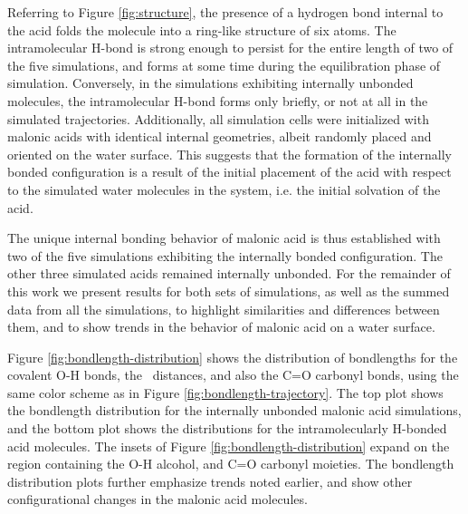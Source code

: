 Referring to Figure \ref{fig:structure}, the presence of a hydrogen bond internal to the acid folds the molecule into a ring-like structure of six atoms. The intramolecular H-bond is strong enough to persist for the entire length of two of the five simulations, and forms at some time during the equilibration phase of simulation. Conversely, in the simulations exhibiting internally unbonded molecules, the intramolecular H-bond forms only briefly, or not at all in the simulated trajectories. Additionally, all simulation cells were initialized with malonic acids with identical internal geometries, albeit randomly placed and oriented on the water surface. This suggests that the formation of the internally bonded configuration is a result of the initial placement of the acid with respect to the simulated water molecules in the system, i.e. the initial solvation of the acid.

The unique internal bonding behavior of malonic acid is thus established with two of the five simulations exhibiting the internally bonded configuration. The other three simulated acids remained internally unbonded. For the remainder of this work we present results for both sets of simulations, as well as the summed data from all the simulations, to highlight similarities and differences between them, and to show trends in the behavior of malonic acid on a water surface.

Figure \ref{fig:bondlength-distribution} shows the distribution of bondlengths for the covalent O-H bonds, the \ocarbh~distances, and also the C=O carbonyl bonds, using the same color scheme as in Figure \ref{fig:bondlength-trajectory}. The top plot shows the bondlength distribution for the internally unbonded malonic acid simulations, and the bottom plot shows the distributions for the intramolecularly H-bonded acid molecules. The insets of Figure \ref{fig:bondlength-distribution} expand on the region containing the O-H alcohol, and C=O carbonyl moieties. The bondlength distribution plots further emphasize trends noted earlier, and show other configurational changes in the malonic acid molecules.

